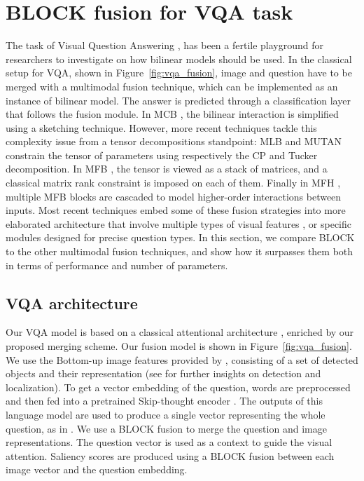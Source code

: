 \documentclass[letterpaper]{article} \usepackage{aaai19}  \usepackage{times}  \usepackage{helvet}  \usepackage{courier}  \usepackage{url}  \usepackage{graphicx}  \usepackage{booktabs}       \usepackage{comment}
\begin{document}
\section{BLOCK fusion for VQA task}
\label{section:vqa_exp}

The task of Visual Question Answering \cite{VQA}, \cite{Goyal_2017_CVPR} has been a fertile playground for researchers to investigate on how bilinear models should be used. 
In the classical setup for VQA, shown in Figure~\ref{fig:vqa_fusion}, image and question have to be merged with a multimodal fusion technique, which can be implemented as an instance of bilinear model. The answer is predicted through a classification layer that follows the fusion module. 
In MCB \cite{FukuiPYRDR16}, the bilinear interaction is simplified using a sketching technique. However, more recent techniques tackle this complexity issue from a tensor decompositions standpoint: MLB \cite{Kim2017} and MUTAN \cite{benyounescadene2017mutan} constrain the tensor of parameters using respectively the CP and Tucker decomposition. In MFB \cite{yu2017mfb}, the tensor is viewed as a stack of matrices, and a classical matrix rank constraint is imposed on each of them. Finally in MFH \cite{yu2018beyond}, multiple MFB blocks are cascaded to model higher-order interactions between inputs.
Most recent techniques embed some of these fusion strategies into more elaborated architecture that involve multiple types of visual features \cite{pythia2018}, or specific modules \cite{zhang2018learning} designed for precise question types.
In this section, we compare BLOCK to the other multimodal fusion techniques, and show how it surpasses them both in terms of performance and number of parameters. 

\subsection{VQA architecture}

Our VQA model is based on a classical attentional architecture \cite{FukuiPYRDR16}, enriched by our proposed merging scheme. Our fusion model is shown in Figure~\ref{fig:vqa_fusion}. 
We use the Bottom-up image features provided by \cite{Teney_2018_CVPR}, consisting of a set of detected objects and their representation (see \cite{bmvc17,wildcat} for further insights on detection and localization). 
To get a vector embedding of the question, words are preprocessed and then fed into a pretrained Skip-thought encoder \cite{Kiros_2015_NIPS}.
The outputs of this language model are used to produce a single vector representing the whole question, as in \cite{yu2018beyond}.
We use a BLOCK fusion to merge the question and image representations.
The question vector is used as a context to guide the visual attention. Saliency scores are produced using a BLOCK fusion between each image vector and the question embedding.
\end{document}

